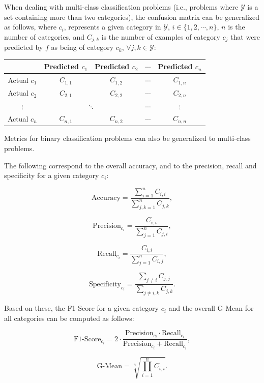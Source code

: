 When dealing with multi-class classification problems (i.e., problems where $\mathcal{Y}$ is a set containing more than two categories), the confusion matrix can be generalized as follows, where $c_i$, represents a given category in $\mathcal{Y}$, $i \in \{1,2,\cdots, n\}$, $n$ is the number of categories, and $C_{j,k}$ is the number of examples of category $c_j$ that were predicted by $f$ as being of category $c_k$, $\forall j,k \in \mathcal{Y}$:

\begin{center}
\begin{tabular}{|c|c|c|c|c|}\hline
     & Predicted $c_1$ & Predicted $c_2$ & $\cdots$ & Predicted $c_n$ \\ \hline
Actual $c_1$     &   $C_{1,1}$   & $C_{1,2}$ & $\cdots$ & $C_{1,n}$       \\ \hline
Actual $c_2$     &   $C_{2,1}$   &  $C_{2,2}$ & $\cdots$ & $C_{2,n}$       \\ \hline
$\vdots$ & \multicolumn{2}{c|}{$\ddots$} & $\cdots$ & $\vdots$ \\ \hline
Actual $c_n$     &   $C_{n,1}$   & $C_{n,2}$ & $\cdots$ &  $C_{n,n}$      \\ \hline
\end{tabular}
\end{center}

Metrics for binary classification problems can also be generalized to multi-class problems. 

The following correspond to the overall accuracy, and to the precision, recall and specificity for a given category $c_i$:

\[ \text{Accuracy} = \frac{\sum_{i=1}^n C_{i,i}}{\sum_{j,k=1}^n C_{j,k}}, \]

\[ \text{Precision}_{c_i} = \frac{C_{i,i}}{\sum_{j=1}^n C_{j,i}}, \]

\[ \text{Recall}_{c_i} = \frac{C_{i,i}}{\sum_{j=1}^n C_{i,j}}, \]

\[ \text{Specificity}_{c_i} = \frac{\sum_{j\neq i} C_{j,j}}{\sum_{j\neq i, k} C_{j,k}}. \]

Based on these, the F1-Score for a given category $c_i$ and the overall G-Mean for all categories can be computed as follows:

\[ \text{F1-Score}_{c_i} = 2 \cdot \frac{ \text{Precision}_{c_i} \cdot \text{Recall}_{c_i}}{\text{Precision}_{c_i} + \text{Recall}_{c_i}}, \]

\[ \text{G-Mean} = \sqrt[n]{\prod_{i=1}^n C_{i,i}}.\]


